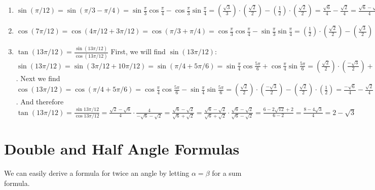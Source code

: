 \begin{Answer}[ref = sum_diff]
\begin{enumerate}
\item $\sin{\left( \pi/12 \right) } = \sin{\left( \pi/3 - \pi/4 \right)} = 
\sin{\frac{\pi}{3}}\cos{\frac{\pi}{4}} - \cos{\frac{\pi}{3}}\sin{\frac{\pi}{4}}
= \left( \frac{\sqrt{3}}{3} \right) \cdot \left(  \frac{\sqrt{2}}{2} \right) - 
\left( \frac{1}{2} \right) \cdot \left( \frac{\sqrt{2}}{2} \right) = \frac{
\sqrt{6}}{4} - \frac{\sqrt{2}}{4} = \frac{\sqrt{6} - \sqrt{2}}{4}$
\item $\cos{\left( 7\pi/12 \right)} = \cos{\left( 4\pi/12 + 3\pi/12 \right)} = 
\cos{ \left( \pi/3 + \pi/4 \right)} = \cos{\frac{\pi}{3}}\cos{\frac{\pi}{4}} - 
\sin{\frac{\pi}{3}}\sin{\frac{\pi}{4}} = \left( \frac{1}{2} \right) \cdot 
\left( \frac{\sqrt{2}}{2} \right) - \left( \frac{\sqrt{3}}{2} \right) \cdot 
\left( \frac{\sqrt{2}}{2} \right) = \frac{\sqrt{2}}{4} - \frac{\sqrt{6}}{4} = 
\frac{\sqrt{2} - \sqrt{6}}{4}$
\item $\tan{ \left( 13\pi/12 \right)} = \frac{\sin{ \left( 13\pi/12 \right)}}{
\cos{ \left( 13\pi/12 \right)}}$ First, we will find $\sin{ \left( 13\pi/12 
\right)}$: $\sin{ \left( 13\pi/12 \right)} = \sin{\left( 3\pi/12 + 10\pi/12 
\right)} = \sin{\left( \pi/4 +  5\pi/6 \right)} = \sin{\frac{\pi}{4}}\cos{
\frac{5\pi}{6}} + \cos{\frac{\pi}{4}}\sin{\frac{5\pi}{6}} = \left( \frac{\sqrt{
2}}{2} \right) \cdot \left( \frac{-\sqrt{3}}{2} \right) + \left( \frac{\sqrt{2}
}{2} \right) \cdot \left( \frac{1}{2} \right) = \frac{-\sqrt{6}}{4} = \frac{
\sqrt{2}}{4} = \frac{\sqrt{2} - \sqrt{6}}{4}$. Next we find $\cos{\left( 13\pi/
12 \right)} = \cos{\left( \pi/4 + 5\pi/6 \right)} = \cos{\frac{\pi}{4}}\cos{
\frac{5\pi}{6}} - \sin{\frac{\pi}{4}}\sin{\frac{5\pi}{6}} = \left( \frac{\sqrt{
2}}{2} \right) \cdot \left( \frac{-\sqrt{3}}{2} \right) - \left( \frac{\sqrt{2
}}{2} \right) \cdot \left( \frac{1}{2} \right) = \frac{-\sqrt{6}}{4} - \frac{
\sqrt{2}}{4} = \frac{-\sqrt{6} - \sqrt{2}}{4}$. And therefore $\tan{ \left( 13
\pi/12 \right)} = \frac{\sin{13\pi/12}}{\cos{13\pi/12}} = \frac{\sqrt{2} - 
\sqrt{6}}{4} \cdot \frac{4}{-\sqrt{6} - \sqrt{2}} = \frac{\sqrt{6} - \sqrt{2}}{
\sqrt{6} + \sqrt{2}} = \frac{\sqrt{6} - \sqrt{2}}{\sqrt{6} + \sqrt{2}} \cdot 
\frac{\sqrt{6} - \sqrt{2}}{\sqrt{6} - \sqrt{2}} = \frac{6 - 2\sqrt{12} + 2}{6 -
2} = \frac{8 - 4\sqrt{3}}{4} = 2 - \sqrt{3}$ 
\end{enumerate}
\end{Answer}

\section{Double and Half Angle Formulas}
We can easily derive a formula for twice an angle by letting $\alpha = \beta$ 
for a sum formula. 

